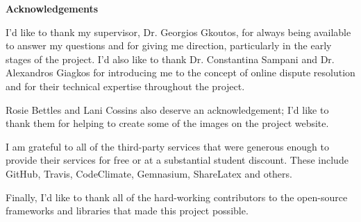 \thispagestyle{empty}

\begin{center}
    {\LARGE\bf Acknowledgements}
\end{center}

I'd like to thank my supervisor, Dr. Georgios Gkoutos, for always being available to answer my questions and for giving me direction, particularly in the early stages of the project. I'd also like to thank Dr. Constantina Sampani and Dr. Alexandros Giagkos for introducing me to the concept of online dispute resolution and for their technical expertise throughout the project.

Rosie Bettles and Lani Cossins also deserve an acknowledgement; I'd like to thank them for helping to create some of the images on the project website.

I am grateful to all of the third-party services that were generous enough to provide their services for free or at a substantial student discount. These include GitHub, Travis, CodeClimate, Gemnasium, ShareLatex and others.

Finally, I'd like to thank all of the hard-working contributors to the open-source frameworks and libraries that made this project possible.